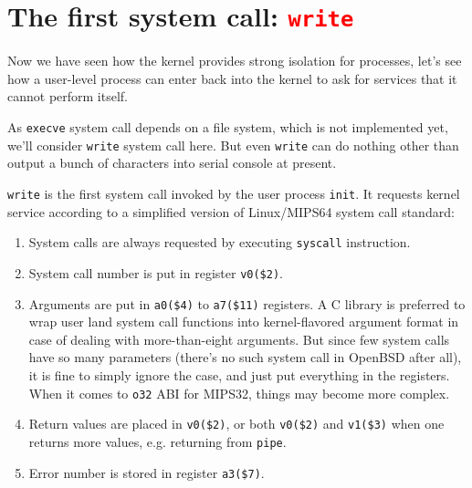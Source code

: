 \documentclass{report}
\def \hilite#1{\textcolor{red}{#1}}
\newenvironment{hilight}{\color{red}}{\color{black}}
\begin{document}
	\section{The first system call: \hilite{\texttt{write}}}
	Now we have seen how the kernel provides strong isolation for processes, let’s see
	how a user-level process can enter back into the kernel to ask for services that it
	cannot perform itself.
	
	\begin{hilight}
		As \texttt{execve} system call depends on a file system, which is not implemented
		yet, we'll consider \texttt{write} system call here.  But even \texttt{write} can
		do nothing other than output a bunch of characters into serial console at present.

		\texttt{write} is the first system call invoked by the user process \texttt{init}.
		It requests kernel service according to a simplified version of Linux/MIPS64 system
		call standard:
		\begin{enumerate}
			\item System calls are always requested by executing \texttt{syscall} instruction.
			\item System call number is put in register \texttt{v0(\$2)}.
			\item Arguments are put in \texttt{a0(\$4)} to \texttt{a7(\$11)} registers.
			A C library is preferred to wrap user land system call functions into kernel-flavored
			argument format in case of dealing with more-than-eight arguments.  But since few system
			calls have so many parameters (there's no such system call in OpenBSD after all),
			it is fine to simply ignore the case, and just put everything in the registers.
			When it comes to \texttt{o32} ABI for MIPS32, things may become more complex.
			\item Return values are placed in \texttt{v0(\$2)}, or both \texttt{v0(\$2)} and
			\texttt{v1(\$3)} when one returns more values, e.g. returning from \texttt{pipe}.
			\item Error number is stored in register \texttt{a3(\$7)}.
		\end{enumerate}
		

\end{hilight}
\end{document}
